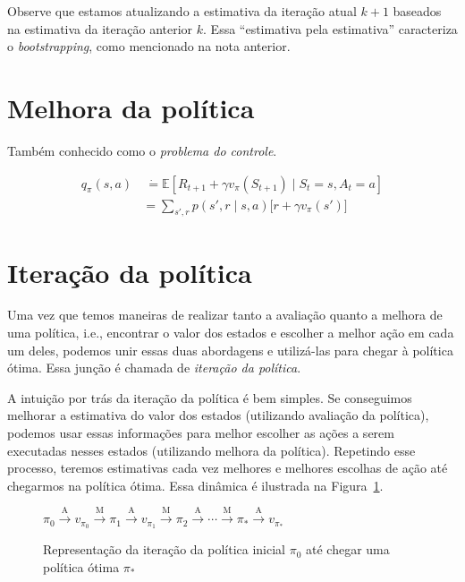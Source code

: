 \documentclass{article}
\begin{document}
            Observe que estamos atualizando a estimativa da iteração atual $k+1$ baseados na estimativa da iteração anterior $k$. Essa ``estimativa pela estimativa'' caracteriza o \emph{bootstrapping}, como mencionado na nota anterior.
        
    \section{Melhora da política}
    
        Também conhecido como o \textit{problema do controle}.
        
        \begin{equation}
            \begin{split}
                q_{\pi}(s,a) & \ \dot{=} \mathbb{E} \left[ R_{t+1} + \gamma v_{\pi}(S_{t+1}) \mid S_t = s, A_t = a \right] \\
                & = \sum_{s',r} p(s', r \mid s, a) \Big[ r + \gamma v_{\pi}(s') \Big]
            \end{split}
        \end{equation}
    
    \section{Iteração da política}
    
        Uma vez que temos maneiras de realizar tanto a avaliação quanto a melhora de uma política, i.e., encontrar o valor dos estados e escolher a melhor ação em cada um deles, podemos unir essas duas abordagens e utilizá-las para chegar à política ótima. Essa junção é chamada de \emph{iteração da política}.
        
        A intuição por trás da iteração da política é bem simples. Se conseguimos melhorar a estimativa do valor dos estados (utilizando avaliação da política), podemos usar essas informações para melhor escolher as ações a serem executadas nesses estados (utilizando melhora da política). Repetindo esse processo, teremos estimativas cada vez melhores e melhores escolhas de ação até chegarmos na política ótima. Essa dinâmica é ilustrada na Figura~\ref{fig:policy-iteration}.
        
        \begin{figure}[ht]
            \centering
            \begin{math}
                \pi_0 \xrightarrow{\ \textrm{A} \ } 
                v_{\pi_0} \xrightarrow{\ \textrm{M} \ } 
                \pi_1 \xrightarrow{\ \textrm{A} \ } 
                v_{\pi_1} \xrightarrow{\ \textrm{M} \ } 
                \pi_2 \xrightarrow{\ \textrm{A} \ } 
                \cdots \xrightarrow{\ \textrm{M} \ }
                \pi_* \xrightarrow{\ \textrm{A} \ } v_{\pi_*}
            \end{math}
            \caption{Representação da iteração da política inicial $\pi_0$ até chegar uma política ótima $\pi_*$}
            \label{fig:policy-iteration}
        \end{figure}
        
\end{document}

